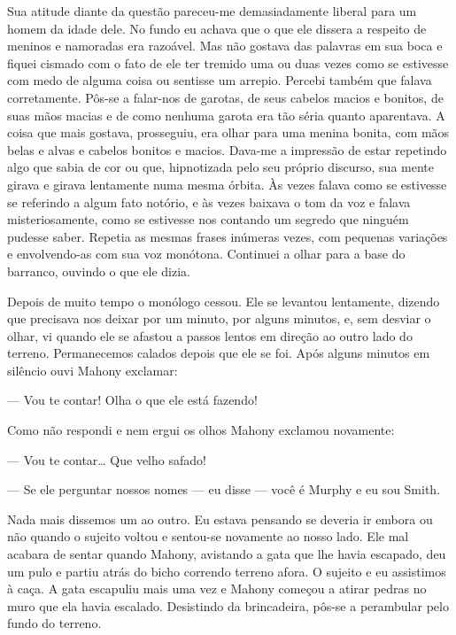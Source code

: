 Sua atitude diante da questão pareceu-me demasiadamente liberal para um homem
da idade dele.  No fundo eu achava que o que ele dissera a respeito de meninos
e namoradas era razoável.  Mas não gostava das palavras em sua boca e fiquei
cismado com o fato de ele ter tremido uma ou duas vezes como se estivesse com
medo de alguma coisa ou sentisse um arrepio.  Percebi também que falava
corretamente.  Pôs-se a falar-nos de garotas, de seus cabelos macios e bonitos,
de suas mãos macias e de como nenhuma garota era tão séria quanto aparentava.
A coisa que mais gostava, prosseguiu, era olhar para uma menina bonita, com
mãos belas e alvas e cabelos bonitos e macios.  Dava-me a impressão de estar
repetindo algo que sabia de cor ou que, hipnotizada pelo seu próprio discurso,
sua mente girava e girava lentamente numa mesma órbita.  Às vezes falava como
se estivesse se referindo a algum fato notório, e às vezes baixava o tom da voz
e falava misteriosamente, como se estivesse nos contando um segredo que ninguém
pudesse saber.  Repetia as mesmas frases inúmeras vezes, com pequenas variações
e envolvendo-as com sua voz monótona.  Continuei a olhar para a base do
barranco, ouvindo o que ele dizia.

Depois de muito tempo o monólogo cessou.  Ele se levantou lentamente, dizendo
que precisava nos deixar por um minuto, por alguns minutos, e, sem desviar o
olhar, vi quando ele se afastou a passos lentos em direção ao outro lado do
terreno.  Permanecemos calados depois que ele se foi.  Após alguns minutos em
silêncio ouvi Mahony exclamar:

--- Vou te contar!  Olha o que ele está fazendo!

Como não respondi e nem ergui os olhos Mahony exclamou novamente:

--- Vou te contar\ldots{} Que velho safado!

--- Se ele perguntar nossos nomes --- eu disse --- você é Murphy e eu sou
Smith.

Nada mais dissemos um ao outro.  Eu estava pensando se deveria ir embora ou não
quando o sujeito voltou e sentou-se novamente ao nosso lado.  Ele mal acabara
de sentar quando Mahony, avistando a gata que lhe havia escapado, deu um pulo e
partiu atrás do bicho correndo terreno afora.  O sujeito e eu assistimos à
caça.  A gata escapuliu mais uma vez e Mahony começou a atirar pedras no muro
que ela havia escalado.  Desistindo da brincadeira, pôs-se a perambular pelo
fundo do terreno.

